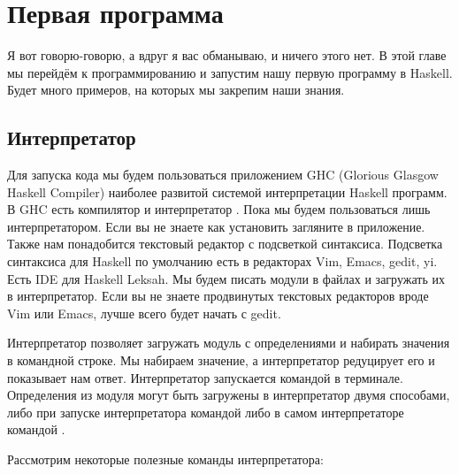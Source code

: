 \setcounter{chapter}{1}
\chapter{Первая программа}

Я вот говорю-говорю, а вдруг я вас обманываю, и ничего
этого нет. В этой главе мы перейдём к программированию и запустим
нашу первую программу в Haskell. Будет много примеров,
на которых мы закрепим наши знания.

\section{Интерпретатор}

 Для запуска кода мы будем пользоваться приложением GHC 
(Glorious Glasgow Haskell Compiler) наиболее  развитой
системой интерпретации Haskell программ. В GHC есть
компилятор  и интерпретатор . Пока
мы будем пользоваться лишь интерпретатором. Если 
вы не знаете как установить  загляните в приложение.
Также нам понадобится текстовый редактор с подсветкой синтаксиса. 
Подсветка синтаксиса для Haskell по умолчанию есть 
в редакторах Vim, Emacs, gedit, yi. Есть IDE для Haskell Leksah.
Мы будем писать модули в файлах и загружать их в интерпретатор.
Если вы не знаете продвинутых текстовых редакторов вроде Vim или
Emacs, лучше всего будет начать с gedit.

Интерпретатор позволяет загружать модуль с определениями и 
набирать значения в командной строке. Мы набираем значение,
а интерпретатор редуцирует его и показывает нам ответ.
Интерпретатор запускается командой  в терминале.
Определения из модуля могут быть загружены в интерпретатор
двумя способами, либо при запуске интерпретатора командой
 либо в самом интерпретаторе командой 
.

Рассмотрим некоторые полезные команды интерпретатора:





